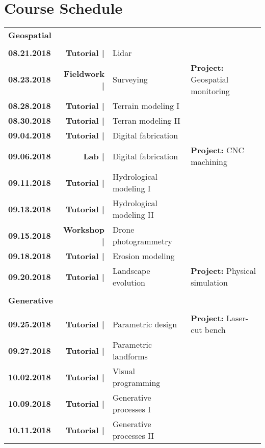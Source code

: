 \documentclass[11pt,article,oneside]{memoir}
\begin{document}
\section{Course Schedule}

\begin{table}[H]
\begin{tabular}{l r @{\hskip 0.1cm} l @{\hskip 0.5cm} l}
\\
\normalsize
\textbf{Geospatial}\\
\small
\\
\textbf{08.21.2018} & \textbf{Tutorial |} & Lidar \\
\textbf{08.23.2018} & \textbf{Fieldwork |} & Surveying & \textbf{Project:} Geospatial monitoring \\
%
\textbf{08.28.2018} & \textbf{Tutorial |} & Terrain modeling I \\
\textbf{08.30.2018} & \textbf{Tutorial |} & Terran modeling  II \\
%
\textbf{09.04.2018} & \textbf{Tutorial |} & Digital fabrication \\
\textbf{09.06.2018} & \textbf{Lab |} & Digital fabrication & \textbf{Project:} CNC machining\\
%
\textbf{09.11.2018} & \textbf{Tutorial |} & Hydrological modeling I \\
\textbf{09.13.2018} & \textbf{Tutorial |} & Hydrological modeling II \\
\textbf{09.15.2018} & \textbf{Workshop |} & Drone photogrammetry \\
%
\textbf{09.18.2018} & \textbf{Tutorial |} & Erosion modeling \\
\textbf{09.20.2018} & \textbf{Tutorial |} & Landscape evolution & \textbf{Project:} Physical simulation \\
\\
\normalsize
\textbf{Generative}\\
\small
\\
\textbf{09.25.2018} & \textbf{Tutorial |} & Parametric design & \textbf{Project:} Laser-cut bench \\
\textbf{09.27.2018} & \textbf{Tutorial |} & Parametric landforms \\
%
\textbf{10.02.2018} & \textbf{Tutorial |} & Visual programming\\
%
\textbf{10.09.2018} & \textbf{Tutorial |} & Generative processes I \\
\textbf{10.11.2018} & \textbf{Tutorial |} & Generative processes II \\ 

\end{tabular}
\end{table}
\end{document}
